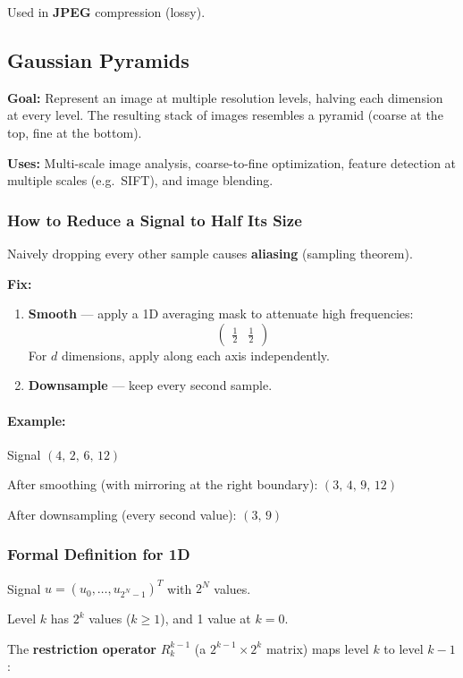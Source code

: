\documentclass{article}
\begin{document}
Used in \textbf{JPEG} compression (lossy).

\subsection{Gaussian Pyramids}
\textbf{Goal:} Represent an image at multiple resolution levels, halving each
dimension at every level. The resulting stack of images resembles a pyramid
(coarse at the top, fine at the bottom).

\textbf{Uses:} Multi-scale image analysis, coarse-to-fine optimization, feature
detection at multiple scales (e.g.\ SIFT), and image blending.

\subsubsection{How to Reduce a Signal to Half Its Size}
Naively dropping every other sample causes \textbf{aliasing} (sampling theorem).

\textbf{Fix:}
\begin{enumerate}
  \item \textbf{Smooth} — apply a 1D averaging mask to attenuate high frequencies:
        \[\begin{pmatrix}\tfrac{1}{2} & \tfrac{1}{2}\end{pmatrix}\]
        For $d$ dimensions, apply along each axis independently.
  \item \textbf{Downsample} — keep every second sample.
\end{enumerate}

\paragraph{Example:} Signal $(4,\,2,\,6,\,12)$

After smoothing (with mirroring at the right boundary):
$(3,\,4,\,9,\,12)$

After downsampling (every second value):
$(3,\,9)$

\subsubsection{Formal Definition for 1D}
Signal $u = (u_0,\dots,u_{2^N-1})^T$ with $2^N$ values.

Level $k$ has $2^k$ values ($k \geq 1$), and 1 value at $k = 0$.

The \textbf{restriction operator} $R_k^{k-1}$ (a $2^{k-1} \times 2^k$ matrix)
maps level $k$ to level $k-1$:
\end{document}
